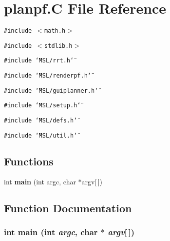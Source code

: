 \section{planpf.C File Reference}
\label{planpf_8C}
{\tt \#include $<$math.h$>$}\par
{\tt \#include $<$stdlib.h$>$}\par
{\tt \#include \char`\"{}MSL/rrt.h\char`\"{}}\par
{\tt \#include \char`\"{}MSL/renderpf.h\char`\"{}}\par
{\tt \#include \char`\"{}MSL/guiplanner.h\char`\"{}}\par
{\tt \#include \char`\"{}MSL/setup.h\char`\"{}}\par
{\tt \#include \char`\"{}MSL/defs.h\char`\"{}}\par
{\tt \#include \char`\"{}MSL/util.h\char`\"{}}\par
\subsection*{Functions}
\begin{CompactItemize}
\item 
int {\bf main} (int argc, char $\ast$argv[$\,$])
\end{CompactItemize}


\subsection{Function Documentation}
\subsubsection{\setlength{\rightskip}{0pt plus 5cm}int main (int {\em argc}, char $\ast$ {\em argv}[$\,$])}\label{planpf_8C_a0}


